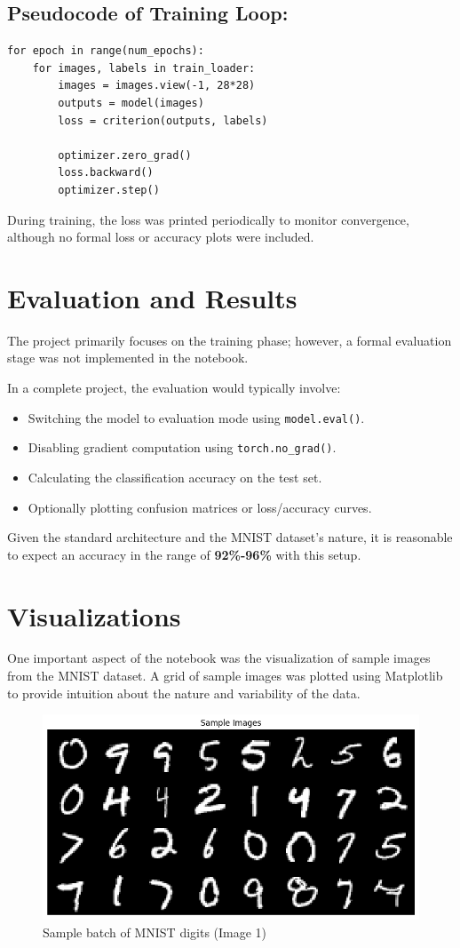 \documentclass{article}
\begin{document}
\subsection*{Pseudocode of Training Loop:}
\begin{verbatim}
for epoch in range(num_epochs):
    for images, labels in train_loader:
        images = images.view(-1, 28*28)
        outputs = model(images)
        loss = criterion(outputs, labels)

        optimizer.zero_grad()
        loss.backward()
        optimizer.step()
\end{verbatim}

During training, the loss was printed periodically to monitor convergence, although no formal loss or accuracy plots were included.

\section{Evaluation and Results}
The project primarily focuses on the training phase; however, a formal evaluation stage was not implemented in the notebook.

In a complete project, the evaluation would typically involve:
\begin{itemize}
    \item Switching the model to evaluation mode using \texttt{model.eval()}.
    \item Disabling gradient computation using \texttt{torch.no\_grad()}.
    \item Calculating the classification accuracy on the test set.
    \item Optionally plotting confusion matrices or loss/accuracy curves.
\end{itemize}

Given the standard architecture and the MNIST dataset's nature, it is reasonable to expect an accuracy in the range of \textbf{92\%-96\%} with this setup.

\section{Visualizations}
One important aspect of the notebook was the visualization of sample images from the MNIST dataset. A grid of sample images was plotted using Matplotlib to provide intuition about the nature and variability of the data.

\begin{figure}[h!]
    \centering
    \includegraphics[width=0.7\linewidth]{output.png}
    \caption{Sample batch of MNIST digits (Image 1)}
    \label{fig:mnist_sample1}
\end{figure}
\end{document}
